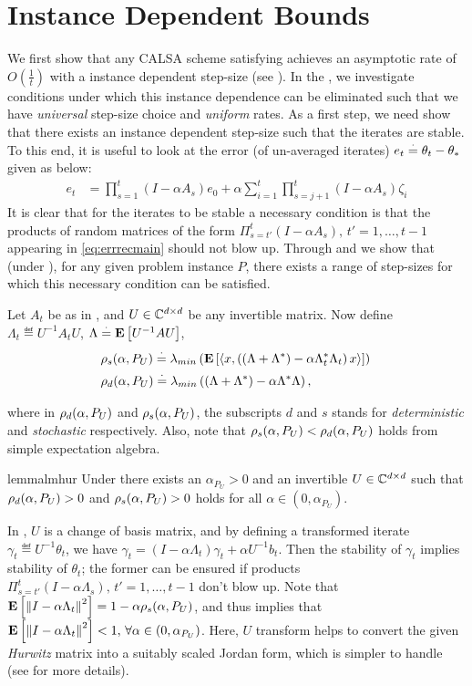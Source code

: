 \section{Instance Dependent Bounds}\label{sec:mainresults}
We first show that any  CALSA scheme satisfying  achieves an asymptotic rate of $O(\frac{1}{t})$ with a instance dependent step-size (see ). In the , we investigate conditions under which this instance dependence can be eliminated such that we have \emph{universal} step-size choice and \emph{uniform} rates.
As a first step, we need show that there exists an instance dependent step-size such that the iterates are stable. To this end, it is useful to look at the error (of un-averaged iterates) $e_t\stackrel{\cdot}{=}\theta_t-\theta_*$ given as below:
\begin{align}\label{eq:errrecmain}
e_t&={\prod_{s=1}^t (I-\alpha A_s) e_0}+\alpha{\sum_{i=1}^t\prod_{s=j+1}^t (I-\alpha A_s)\zeta_i}
\end{align}
It is clear that for the iterates to be stable a necessary condition is that the products of random matrices  of the form $\Pi_{s=t'}^{t}(I-\alpha A_s),\,t'=1,\ldots,t-1$ appearing in \eqref{eq:errrecmain} should not blow up. Through  and  we show that (under ), for any given problem instance $P$, there exists a range of step-sizes for which this necessary condition can be satisfied.
\begin{definition}\label{def:spect}
Let $A_t$ be as in , and $U\in\mathbb{C}^{d \times d}$ be any invertible matrix. Now define $\Lambda_t\eqdef U^{-1}A_t U$, $\Lambda\stackrel{\cdot}{=} \mathbf{E}\left[U^{-1}A U\right]$,
\begin{align*}
&\rho_s(\alpha,P_U)\stackrel{\cdot}{=} \lambda_{min}\left(\mathbf{E}\left[\langle x,\left((\Lambda+\Lambda^*)-\alpha \Lambda_t^*\Lambda_t\right)x\rangle\right]\right)\,\\
& \rho_d(\alpha,P_U)\stackrel{\cdot}{=} \lambda_{min}\left((\Lambda+\Lambda^*)-\alpha \Lambda^* \Lambda\right),
\end{align*}
\end{definition}
where in $\rho_d(\alpha,P_U)$ and $\rho_s(\alpha,P_U)$, the subscripts $d$ and $s$ stands for \emph{deterministic} and \emph{stochastic} respectively. Also, note that $\rho_s(\alpha,P_U)<\rho_d(\alpha,P_U)$ holds from simple expectation algebra.
\begin{restatable}{lemma}{lmhur}\label{lm:hur}
Under  there exists an $\alpha_{P_U}>0$ and an invertible $U\in \mathbb{C}^{d \times d}$ such that $\rho_d(\alpha,P_U)>0$ and $\rho_s(\alpha,P_U)>0$ holds for all $\alpha \in (0,\alpha_{P_U})$. 
\end{restatable}
In , $U$ is a change of basis matrix, and by defining a transformed iterate $\gamma_t\eqdef U^{-1}\theta_t$, we have $\gamma_t=(I-\alpha \Lambda_t) \gamma_t +\alpha U^{-1}b_t$. Then the stability of $\gamma_t$ implies stability of $\theta_t$; the former can be ensured if products $\Pi_{s=t'}^t (I-\alpha \Lambda_s),\,t'=1,\ldots,t-1$ don't blow up. Note that $\mathbf{E}\left[\left\| I-\alpha \Lambda_t\right\|^2\right]=1-\alpha \rho_s(\alpha,P_U)$, and thus  implies that $\mathbf{E}\left[\left\| I-\alpha \Lambda_t\right\|^2\right]<1,\,\forall \alpha\in (0,\alpha_{P_U})$. Here, $U$ transform helps to convert the given \emph{Hurwitz} matrix into a suitably scaled Jordan form, which is simpler to handle (see  for more details).

